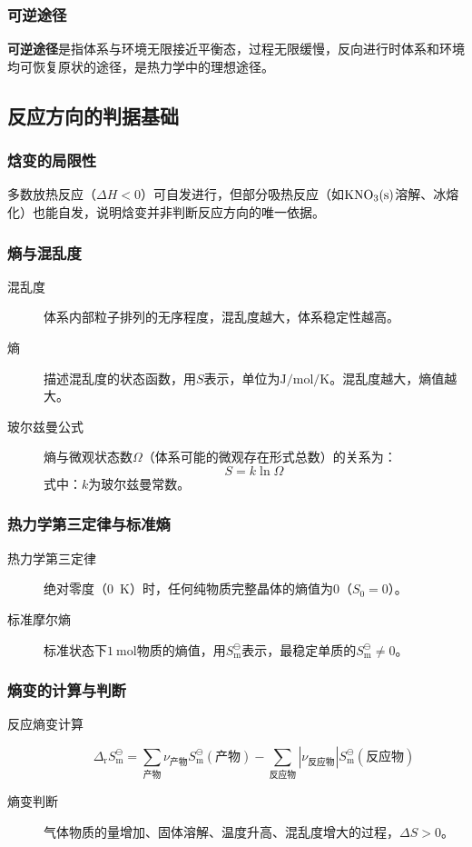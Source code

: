 \subsubsection{可逆途径}
\textbf{可逆途径}是指体系与环境无限接近平衡态，过程无限缓慢，反向进行时体系和环境均可恢复原状的途径，是热力学中的理想途径。

\subsection{反应方向的判据基础}
\subsubsection{焓变的局限性}
多数放热反应（$\Delta H<0$）可自发进行，但部分吸热反应（如$\ce{KNO3(s)}$溶解、冰熔化）也能自发，说明焓变并非判断反应方向的唯一依据。

\subsubsection{熵与混乱度}
\begin{description}
    \item[混乱度] 体系内部粒子排列的无序程度，混乱度越大，体系稳定性越高。
    \item[熵] 描述混乱度的状态函数，用$S$表示，单位为$
\si{\joule\per\mole\per\kelvin}$。混乱度越大，熵值越大。
    \item[玻尔兹曼公式] 熵与微观状态数$\varOmega$（体系可能的微观存在形式总数）的关系为：
    \[
    S = k\ln\varOmega
    \]
    式中：$k$为玻尔兹曼常数。
\end{description}

\subsubsection{热力学第三定律与标准熵}
\begin{description}
    \item[热力学第三定律] 绝对零度（\qty{0}{\kelvin}）时，任何纯物质完整晶体的熵值为$0$（$S_0=0$）。
    \item[标准摩尔熵] 标准状态下$\qty{1}{\mole}$物质的熵值，用$S_{\text{m}}^\ominus$表示，最稳定单质的$S_{\text{m}}^\ominus\neq0$。
\end{description}

\subsubsection{熵变的计算与判断}
\begin{description}
    \item[反应熵变计算]
    \[
    \Delta_{\text{r}}S_{\text{m}}^\ominus = \sum_{\text{产物}}\nu_{\text{产物}}S_{\text{m}}^\ominus(\text{产物}) - \sum_{\text{反应物}}|\nu_{\text{反应物}}|S_{\text{m}}^\ominus(\text{反应物})
    \]
    \item[熵变判断] 气体物质的量增加、固体溶解、温度升高、混乱度增大的过程，$\Delta S>0$。
\end{description}

